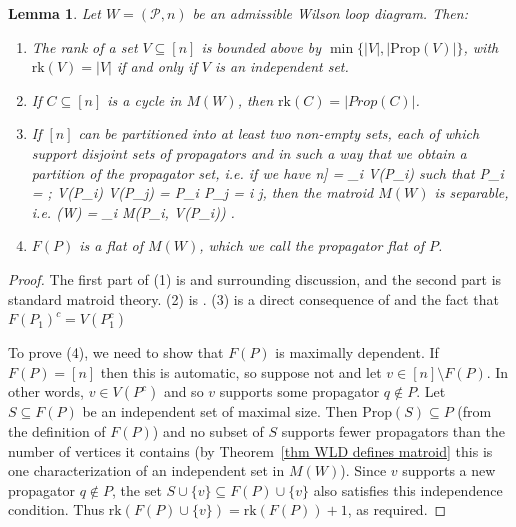 \documentclass[11pt]{article}
\newcommand{\rk}{\textrm{rk} }
\def\bas #1\eas{\begin{align*} #1 \end{align*}}
\newcommand{\cP}{\mathcal{P}}
\newcommand{\Prop}{\textrm{Prop}}
\newtheorem{lem}[thm]{Lemma}
\theoremstyle{remark}
\theoremstyle{definition}
\begin{document}
\begin{lem}\label{lem facts about WLD matroids}
Let $W = (\cP,n)$ be an admissible Wilson loop diagram. Then:
\begin{enumerate}
\item The rank of a set $V \subseteq [n]$ is bounded above by $\min\{|V|,|\Prop(V)|\}$, with $\rk(V) = |V|$ if and only if $V$ is an independent set.
\item If $C \subseteq [n]$ is a cycle in $M(W)$, then $\rk(C) = |Prop(C)|$.
\item If $[n]$ can be partitioned into at least two non-empty sets, each of which support disjoint sets of propagators and in such a way that we obtain a partition of the propagator set, i.e. if we have \bas [n] = \sqcup_i V(P_i) \quad \textrm{ such that } \quad \sqcup P_i = \cP;  V(P_i) \cap V(P_j) = \emptyset {} P_i \cap P_j = \emptyset \quad \forall i \neq j\;, \eas then the matroid $M(W)$ is separable, i.e. \bas M(W) = \bigoplus_i M(P_i, V(P_i)) \;.\eas 
\item $F(P)$ is a flat of $M( W)$, which we call the \emph{propagator flat} of $P$.
\end{enumerate}
\end{lem}
\begin{proof}
The first part of (1) is \cite[Equation (9)]{wilsonloop} and surrounding discussion, and the second part is standard matroid theory. (2) is \cite[Lemma 3.27]{wilsonloop}. (3) is a direct consequence of \cite[Lemma 3.20]{wilsonloop} and the fact that $F(P_1)^c = V(P_1^c)$

To prove (4), we need to show that $F(P)$ is maximally dependent. If $F(P) = [n]$ then this is automatic, so suppose not and let $v \in [n] \setminus F(P)$. In other words, $v \in V(P^c)$ and so $v$ supports some propagator $q \not\in P$.  Let $S \subseteq F(P)$ be an independent set of maximal size. Then $\Prop(S) \subseteq P$ (from the definition of $F(P)$) and no subset of $S$ supports fewer propagators than the number of vertices it contains (by Theorem~\ref{thm WLD defines matroid} this is one characterization of an independent set in $M(W)$). Since $v$ supports a new propagator $q \not\in P$, the set $S \cup \{v\} \subseteq F(P) \cup\{v\}$ also satisfies this independence condition. Thus $\rk(F(P) \cup\{v\}) = \rk(F(P)) + 1$, as required.
\end{proof}
\end{document}
